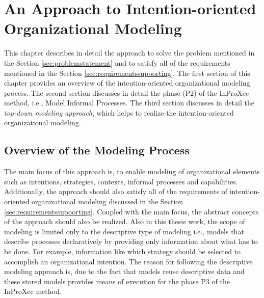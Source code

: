 \chapter{An Approach to Intention-oriented Organizational Modeling}
\label{chap:approach}
This chapter describes in detail the approach to solve the problem mentioned in the Section \ref{sec:problemstatement} and to satisfy all of the requirements mentioned in the Section \ref{sec:requirementssupoorting}. The first section of this chapter provides an overview of the intention-oriented organizational modeling process. The second section discusses in detail the phase (P2) of the InProXec method, i.e., Model Informal Processes. The third section discusses in detail the \textit{top-down modeling approach}, which helps to realize the intention-oriented organizational modeling. 

\section{Overview of the Modeling Process}
\label{sec:overviewmodelingprocess}
The main focus of this approach is, to enable modeling of organizational elements such as intentions, strategies, contexts, informal processes and capabilities. Additionally, the approach should also satisfy all of the requirements of intention-oriented organizational modeling discussed in the Section \ref{sec:requirementssupoorting}. Coupled with the main focus, the abstract concepts of the approach should also be realized. Also in this thesis work, the scope of modeling is limited only to the descriptive type of modeling i.e., models that describe processes declaratively by providing only information about what has to be done. For example, information like which strategy should be selected to accomplish an organizational intention. The reason for following the descriptive modeling approach is, due to the fact that models reuse descriptive data and these stored models provides means of execution for the phase P3 of the InProXec method. 

